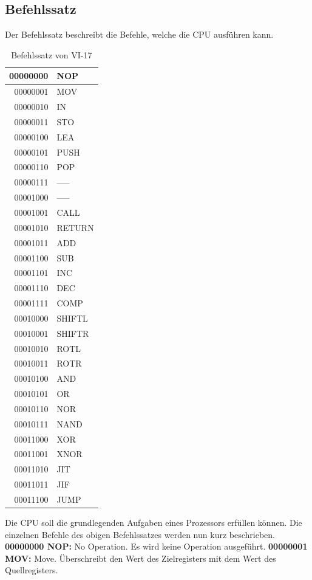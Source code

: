 \documentclass[12pt]{article}
\begin{document}
\subsection{Befehlssatz}

Der Befehlssatz beschreibt die Befehle, welche die CPU ausführen kann.
\newpage
\begin{table}[!htb]
\centering
\begin{tabular}{|r|l|}
  \hline
  00000000 & NOP \\
  \hline
  00000001 & MOV\\ 
  \hline
  00000010 & IN\\
  \hline
  00000011 & STO\\
  \hline
  00000100 & LEA\\
  \hline
  00000101 & PUSH \\ 
  \hline
  00000110 & POP\\
  \hline
  00000111 & -----\\
 \hline
  00001000 & ----- \\
  \hline
  00001001 & CALL\\ 
  \hline
  00001010 & RETURN\\
  \hline
  00001011 & ADD\\
  \hline 
 00001100 & SUB \\
  \hline
  00001101 & INC\\ 
  \hline
  00001110 & DEC\\
  \hline
  00001111 & COMP\\
  \hline
  00010000 & SHIFTL\\
  \hline
  00010001 & SHIFTR\\ 
  \hline
  00010010 & ROTL\\
  \hline
  00010011 & ROTR\\
  \hline
  00010100 & AND\\
  \hline
  00010101 & OR \\ 
  \hline
  00010110 & NOR\\
  \hline
  00010111 & NAND\\
  \hline
  00011000 & XOR\\
  \hline
  00011001 & XNOR \\
  \hline
  00011010 & JIT\\
  \hline
  00011011 & JIF\\
  \hline
  00011100 & JUMP\\
  \hline
\end{tabular}
\caption{Befehlssatz von VI-17}
\end{table}
\newpage
Die CPU soll die grundlegenden Aufgaben eines Prozessors erfüllen können. Die einzelnen Befehle des obigen Befehlssatzes werden nun kurz beschrieben.
\newline
\indent 
\textbf{00000000 NOP: }No Operation. Es wird keine Operation ausgeführt.
\newline
\indent 
\textbf{00000001 MOV: } Move. Überschreibt den Wert des Zielregisters mit dem Wert des Quellregisters. 
\end{document}
